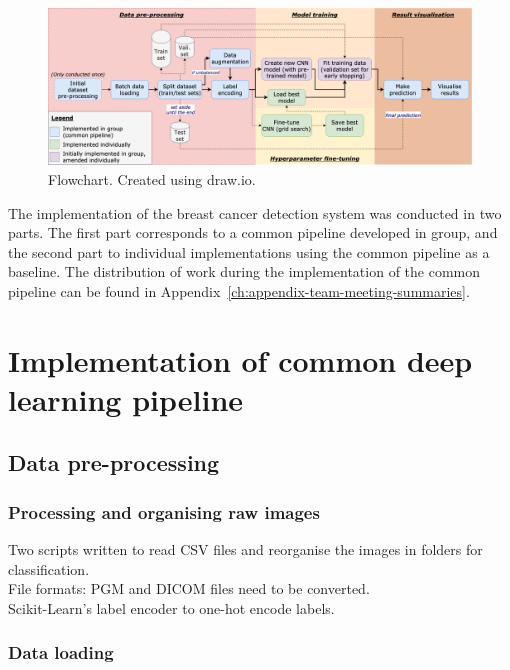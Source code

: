 \begin{figure}[ht]
\centerline{\includegraphics[width=1.25\textwidth]{Dissertation/figures/implementation/detailed flowchart.png}}
\caption{\label{fig:implementation-detailed-flowchart}Flowchart. Created using draw.io.}
\end{figure}

The implementation of the breast cancer detection system was conducted in two parts. The first part corresponds to a common pipeline developed in group, and the second part to individual implementations using the common pipeline as a baseline. The distribution of work during the implementation of the common pipeline can be found in Appendix~\ref{ch:appendix-team-meeting-summaries}.

\section{Implementation of common deep learning pipeline}


\subsection{Data pre-processing}

\subsubsection{Processing and organising raw images}

Two scripts written to read CSV files and reorganise the images in folders for classification.\\

File formats: PGM and DICOM files need to be converted.\\

Scikit-Learn's label encoder to one-hot encode labels.


\subsubsection{Data loading}

